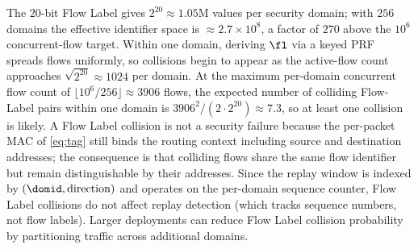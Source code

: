 The $20$-bit Flow Label gives $2^{20}\approx1.05$M values per security domain; with $256$ domains
the effective identifier space is $\approx2.7\times10^8$, a factor of $270$ above the
$10^6$ concurrent-flow target. Within one domain, deriving $\fl$ via a keyed PRF spreads flows uniformly, so collisions begin to appear as the
active-flow count approaches $\sqrt{2^{20}}\approx1024$ per domain. At the
maximum per-domain concurrent flow count of $\lfloor10^6/256\rfloor\approx3906$
flows, the expected number of colliding Flow-Label pairs within one domain is
$3906^2/(2\cdot2^{20})\approx7.3$, so at least one collision is likely.
A Flow Label collision is not a security failure because the per-packet MAC of
\cref{eq:tag} still binds the routing context including source and destination addresses; the consequence is that colliding flows share the same flow identifier but remain distinguishable by their addresses. Since the replay window is indexed by $(\domid, \text{direction})$ and operates on the per-domain sequence counter, Flow Label collisions do not affect replay detection (which tracks sequence numbers, not flow labels). Larger deployments can reduce Flow Label collision probability by partitioning traffic across additional domains.
